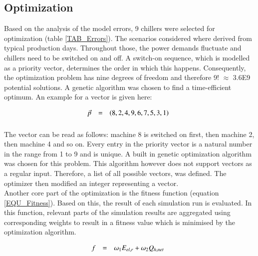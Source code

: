 \documentclass[3p,times,procedia,twocolumn,twoside]{elsarticle}
\begin{document}
\subsection{Optimization}
Based on the analysis of the model errors, 9 chillers were selected for optimization (table \ref{TAB_Errors}). The scenarios considered where derived from typical production days. Throughout those, the power demands fluctuate and chillers need to be switched on and off. A switch-on sequence, which is modelled as a priority vector, determines the order in which this happens. Consequently, the optimization problem has nine degrees of freedom and therefore 9! $\approx$ 3.6E9 potential solutions. A genetic algorithm was chosen to find a time-efficient optimum.
An example for a vector is given here:

\begin{equation}
\begin{array}{@{}lcl}

\displaystyle 
\vec{p} &=& 
\displaystyle 
\left(8,2,4,9,6,7,5,3,1\right)
\\[6pt]

\end{array}\vspace*{-12pt}
\end{equation}

The vector can be read as follows: machine 8 is switched on first, then machine 2, then machine 4 and so on. Every entry in the priority vector is a natural number in the range from 1 to 9 and is unique. A built in genetic optimization algorithm was chosen for this problem. This algorithm however does not support vectors as a regular input. Therefore, a list of all possible vectors, was defined. The optimizer then modified an integer representing a vector.\\
Another core part of the optimization is the fitness function (equation \ref{EQU_Fitness}). Based on this, the result of each simulation run is evaluated. In this function, relevant parts of the simulation results are aggregated using corresponding weights to result in a fitness value which is minimised by the optimization algorithm.

\begin{equation}
\begin{array}{@{}lcl}

\displaystyle 
f &=& 
\displaystyle 
\omega_{1}E_{el,r} + \omega_{2}Q_{h,net}
\\[6pt]

\end{array}\vspace*{-12pt}
\label{EQU_Fitness}
\end{equation}
\end{document}
